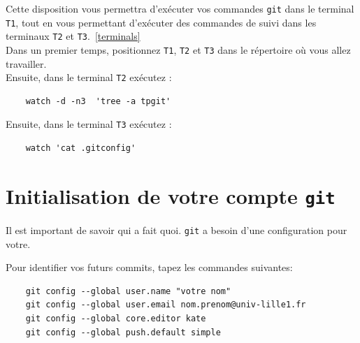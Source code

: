 \documentclass[final, a4paper, openbib, ]{article}
\begin{document}
Cette disposition vous permettra d'exécuter vos commandes \texttt{git} dans le terminal \texttt{T1}, tout en vous permettant d'exécuter des commandes de suivi dans les terminaux \texttt{T2} et \texttt{T3}.~\ref{terminals}\\

Dans un premier temps, positionnez \texttt{T1}, \texttt{T2} et \texttt{T3} dans le répertoire où vous allez travailler.\\

Ensuite, dans le terminal \texttt{T2} exécutez :
\begin{verbatim}
	watch -d -n3  'tree -a tpgit'
\end{verbatim}

Ensuite, dans le terminal \texttt{T3} exécutez :
\begin{verbatim}
	watch 'cat .gitconfig'
\end{verbatim}


%


\section{Initialisation de votre compte \texttt{git}}

Il est important de savoir qui a fait quoi. \texttt{git} a besoin d'une configuration pour votre.

Pour identifier vos futurs commits, tapez les commandes suivantes:

\begin{verbatim}
	git config --global user.name "votre nom"
	git config --global user.email nom.prenom@univ-lille1.fr
	git config --global core.editor kate
	git config --global push.default simple
\end{verbatim}
\end{document}
